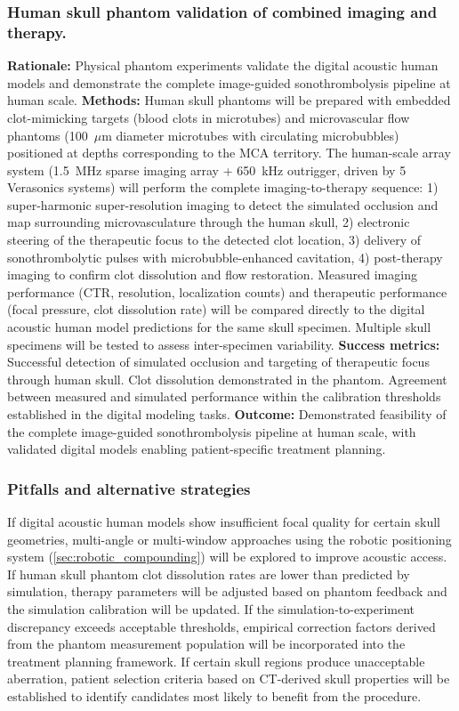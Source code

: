 \subsubsection{Human skull phantom validation of combined imaging and therapy.\label{sec:phantom_validation}}
\textbf{Rationale:} Physical phantom experiments validate the digital acoustic human models and demonstrate the complete image-guided sonothrombolysis pipeline at human scale. \textbf{Methods:} Human skull phantoms will be prepared with embedded clot-mimicking targets (blood clots in microtubes) and microvascular flow phantoms (100~$\mu$m diameter microtubes with circulating microbubbles) positioned at depths corresponding to the MCA territory. The human-scale array system (1.5~MHz sparse imaging array + 650~kHz outrigger, driven by 5 Verasonics systems) will perform the complete imaging-to-therapy sequence: 1) super-harmonic super-resolution imaging to detect the simulated occlusion and map surrounding microvasculature through the human skull, 2) electronic steering of the therapeutic focus to the detected clot location, 3) delivery of sonothrombolytic pulses with microbubble-enhanced cavitation, 4) post-therapy imaging to confirm clot dissolution and flow restoration. Measured imaging performance (CTR, resolution, localization counts) and therapeutic performance (focal pressure, clot dissolution rate) will be compared directly to the digital acoustic human model predictions for the same skull specimen. Multiple skull specimens will be tested to assess inter-specimen variability. \textbf{Success metrics:} Successful detection of simulated occlusion and targeting of therapeutic focus through human skull. Clot dissolution demonstrated in the phantom. Agreement between measured and simulated performance within the calibration thresholds established in the digital modeling tasks. \textbf{Outcome:} Demonstrated feasibility of the complete image-guided sonothrombolysis pipeline at human scale, with validated digital models enabling patient-specific treatment planning.

\subsubsection{Pitfalls and alternative strategies}
If digital acoustic human models show insufficient focal quality for certain skull geometries, multi-angle or multi-window approaches using the robotic positioning system (\ref{sec:robotic_compounding}) will be explored to improve acoustic access. If human skull phantom clot dissolution rates are lower than predicted by simulation, therapy parameters will be adjusted based on phantom feedback and the simulation calibration will be updated. If the simulation-to-experiment discrepancy exceeds acceptable thresholds, empirical correction factors derived from the phantom measurement population will be incorporated into the treatment planning framework. If certain skull regions produce unacceptable aberration, patient selection criteria based on CT-derived skull properties will be established to identify candidates most likely to benefit from the procedure.

